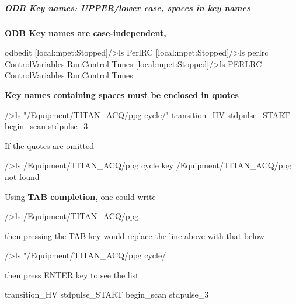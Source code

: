  \par
 \label{RC_odbedit_examples_idx_ODB_key_names}
\hypertarget{RC_odbedit_examples_idx_ODB_key_names}{}
 \hypertarget{RC_odbedit_examples_RC_odbedit_keynames}{}\subparagraph{ODB Key names: UPPER/lower case, spaces in key names}\label{RC_odbedit_examples_RC_odbedit_keynames}
{\bfseries ODB Key names are case-\/independent,} 
\begin{DoxyCode}
 odbedit
[local:mpet:Stopped]/>ls
PerlRC
[local:mpet:Stopped]/>ls perlrc
ControlVariables
RunControl
Tunes
[local:mpet:Stopped]/>ls PERLRC
ControlVariables
RunControl
Tunes
\end{DoxyCode}
 {\bfseries Key names containing spaces must be enclosed in quotes} 
\begin{DoxyCode}
/>ls "/Equipment/TITAN_ACQ/ppg cycle/"
transition_HV
stdpulse_START
begin_scan
stdpulse_3
\end{DoxyCode}
 If the quotes are omitted 
\begin{DoxyCode}
/>ls /Equipment/TITAN_ACQ/ppg cycle
key /Equipment/TITAN_ACQ/ppg not found
\end{DoxyCode}
 Using {\bfseries TAB completion,} one could write 
\begin{DoxyCode}
/>ls /Equipment/TITAN_ACQ/ppg  
\end{DoxyCode}
 then pressing the TAB key would replace the line above with that below 
\begin{DoxyCode}
/>ls "/Equipment/TITAN_ACQ/ppg cycle/ 
\end{DoxyCode}
 then press ENTER key to see the list 
\begin{DoxyCode}
transition_HV
stdpulse_START
begin_scan
stdpulse_3
\end{DoxyCode}


\label{RC_odbedit_examples_idx_ODB_corrupted}
\hypertarget{RC_odbedit_examples_idx_ODB_corrupted}{}
 

